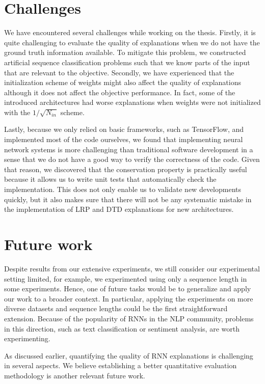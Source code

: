 \section{Challenges}
We have encountered several challenges while working on the thesis. Firstly, it is quite challenging to evaluate the quality of explanations when we do not have the ground truth information available. To mitigate this problem, we constructed artificial sequence classification problems such that we know parts of the input that are relevant to the objective.  Secondly, we have experienced that the initialization scheme of weights might also affect the quality of explanations although it does not affect the objective performance. In fact, some of the introduced architectures had worse explanations when weights were not initialized with the $1/\sqrt{N_{in}}$ scheme.

Lastly, because we only relied on basic frameworks, such as TensorFlow, and implemented most of the code ourselves, we found that implementing neural network systems is more challenging than traditional software development in a sense that we do not have a good way to verify the correctness of the code. Given that reason, we discovered that the conservation property is practically useful because it allows us to write unit tests that automatically check the implementation. This does not only enable us to validate new developments quickly, but it also makes sure that there will not be any systematic mistake in the implementation of LRP and DTD explanations for new architectures.


\section{Future work}
Despite results from our extensive experiments, we still consider our experimental setting limited, for example, we experimented using only a sequence length in some experiments.  Hence, one of future tasks would be to generalize and apply our work to a broader context. In particular,  applying the experiments on more diverse datasets and sequence lengths could be the first straightforward extension. Because of the popularity of RNNs in the NLP community, problems in this direction, such as text classification or sentiment analysis, are worth experimenting. 

As discussed earlier, quantifying the quality of RNN explanations is challenging in several aspects. We believe establishing a better quantitative evaluation methodology is another relevant future work.